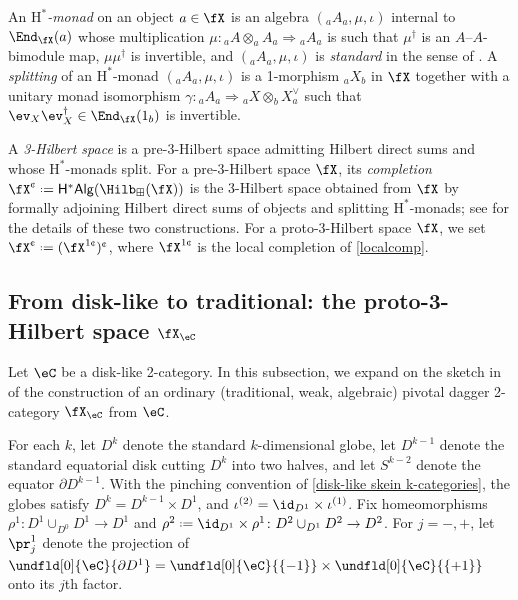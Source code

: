 \documentclass[12pt,reqno]{amsart}
\newcommand{\C}{\eC}
\newcommand{\Hstar}{\ensuremath{\mathrm{H}^{*}}}
\newcommand{\defn}[1]{\emph{#1}}
\newcommand{\cent}{\textup{\textcent}}
\DeclareRobustCommand{\coloneq}{\mathrel{\vcenter{\baselineskip0.5ex\lineskiplimit0pt\hbox{\scriptsize{\upshape.}}\hbox{\scriptsize{\upshape.}}}}=}
\begin{document}
\begin{definition}
An \defn{$\Hstar$-monad} on an object $a\in\fX$ is an algebra $({}_aA_a,\mu,\iota)$ internal to $\End_\fX(a)$ whose multiplication $\mu\colon {}_aA\otimes_a A_a\Rightarrow {}_aA_a$ is such that $\mu^\dag$ is an $A$--$A$-bimodule map, $\mu\mu^\dag$ is invertible, and $({}_aA_a,\mu,\iota)$ is \defn{standard} in the sense of \cite[Defn. 3.18, ($\Hstar$3)]{3Hilb}. A \defn{splitting} of an $\Hstar$-monad $({}_aA_a,\mu,\iota)$ is a 1-morphism ${}_aX_b$ in $\fX$ together with a unitary monad isomorphism $\gamma\colon {}_aA_a\Rightarrow {}_aX\otimes_b X_a^\vee$ such that $\ev_X\ev_X^\dag\in\End_\fX(1_b)$ is invertible.
\end{definition}

\begin{definition}
  \label{def:completion-3hilb}
  A \defn{3-Hilbert space} is a pre-3-Hilbert space admitting Hilbert direct sums and whose $\Hstar$-monads split. For a pre-3-Hilbert space $\fX$, its \defn{completion} $\fX^\cent\coloneq\mathsf{H^*Alg}(\Hilb_\boxplus(\fX))$ is the 3-Hilbert space obtained from $\fX$ by formally adjoining Hilbert direct sums of objects and splitting $\Hstar$-monads; see \cite{3Hilb} for the details of these two constructions. For a proto-3-Hilbert space $\fX$, we set $\fX^\cent\coloneq(\fX^{1\cent})^\cent$, where $\fX^{1\cent}$ is the local completion of \cref{localcomp}.
\end{definition}

\subsection{From disk-like to traditional: the proto-3-Hilbert space \texorpdfstring{$\fX_\C$}{X(C)}}
\label{skein 2-categories}
Let $\C$ be a disk-like 2-category. In this subsection, we expand on the sketch in \cite[Appendix C.2]{MW12} of the construction of an ordinary (traditional, weak, algebraic) pivotal dagger 2-category $\fX_\C$ from $\C$. 

For each $k$, let $D^k$ denote the standard $k$-dimensional globe, let $D^{k-1}$ denote the standard equatorial disk cutting $D^k$ into two halves, and let $S^{k-2}$ denote the equator $\partial D^{k-1}$. With the pinching convention of \cref{disk-like skein k-categories}, the globes satisfy $D^k=D^{k-1}\times D^1$, and $\iota^{(2)}=\id_{D^1}\times\iota^{(1)}$. Fix homeomorphisms $\rho^1 \colon D^1 \cup_{D^0} D^1 \to D^1$ and $\rho^2\coloneq\id_{D^1}\times\rho^1 \colon D^2 \cup_{D^1} D^2 \to D^2$. For $j=-,+$, let $\pr^1_j$ denote the projection of $\undfld[0]{\C}{\partial D^1}=\undfld[0]{\C}{\{-1\}}\times\undfld[0]{\C}{\{+1\}}$ onto its $j$th factor.
\end{document}
